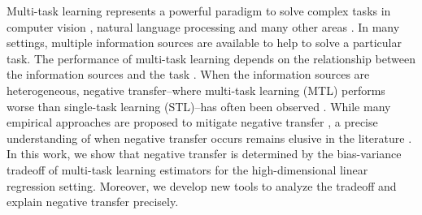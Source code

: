 Multi-task learning represents a powerful paradigm to solve complex tasks in computer vision \cite{chexnet17,ZSSGM18}, natural language processing \cite{GLUE,superglue} and many other areas \cite{ZY17}.
In many settings, multiple information sources are available to help to solve a particular task.
The performance of multi-task learning depends on the relationship between the information sources and the task \cite{C97}.
When the information sources are heterogeneous, negative transfer--where multi-task learning (MTL)  performs worse than single-task learning (STL)--has often been observed \cite{PY09,AP16,BS17}.
While many empirical approaches are proposed to mitigate negative transfer \cite{ZY17}, a precise understanding of when negative transfer occurs remains elusive in the literature \cite{R17}.
In this work, we show that negative transfer is determined by the bias-variance tradeoff of multi-task learning estimators for the high-dimensional linear regression setting. %
Moreover, we develop new tools to analyze the tradeoff and explain negative transfer precisely.

